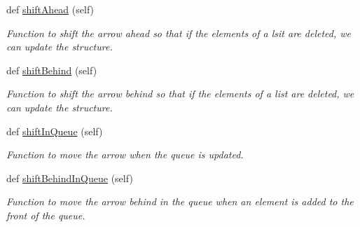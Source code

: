 \begin{DoxyCompactItemize}
def \hyperlink{class_doubly_linked_list_1_1_double_arrow_ad116df463a063a94e2319496399cbb71}{shift\+Ahead} (self)
\begin{DoxyCompactList}\small\item\em Function to shift the arrow ahead so that if the elements of a lsit are deleted, we can update the structure. \end{DoxyCompactList}\item 
\mbox{\label{class_doubly_linked_list_1_1_double_arrow_af97b0c543219cf8cb76e6738852cb61c}} 
def \hyperlink{class_doubly_linked_list_1_1_double_arrow_af97b0c543219cf8cb76e6738852cb61c}{shift\+Behind} (self)
\begin{DoxyCompactList}\small\item\em Function to shift the arrow behind so that if the elements of a list are deleted, we can update the structure. \end{DoxyCompactList}\item 
\mbox{\label{class_doubly_linked_list_1_1_double_arrow_a32bad8701d3e17fd2db99023d16cc961}} 
def \hyperlink{class_doubly_linked_list_1_1_double_arrow_a32bad8701d3e17fd2db99023d16cc961}{shift\+In\+Queue} (self)
\begin{DoxyCompactList}\small\item\em Function to move the arrow when the queue is updated. \end{DoxyCompactList}\item 
\mbox{\label{class_doubly_linked_list_1_1_double_arrow_ac9d44f463d987ef7bba3c5f4ee5bf2c7}} 
def \hyperlink{class_doubly_linked_list_1_1_double_arrow_ac9d44f463d987ef7bba3c5f4ee5bf2c7}{shift\+Behind\+In\+Queue} (self)
\begin{DoxyCompactList}\small\item\em Function to move the arrow behind in the queue when an element is added to the front of the queue. \end{DoxyCompactList}\end{DoxyCompactItemize}
